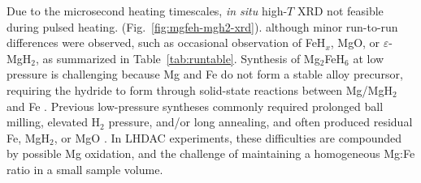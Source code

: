 \documentclass[draft,jgrga,12pt]{agujournal2019}
\begin{document}
Due to the microsecond heating timescales, \textit{in situ} high-$T$ XRD  not feasible during pulsed heating. 
 (Fig.~\ref{fig:mgfeh-mgh2-xrd}). 
 although minor run-to-run differences were observed, such as occasional observation of FeH$_x$, MgO, or $\varepsilon$-MgH$_2$, as summarized in Table~\ref{tab:runtable}.
Synthesis of Mg$_2$FeH$_6$ at low pressure is challenging because Mg and Fe do not form a stable alloy precursor, requiring the hydride to form through solid-state reactions between Mg/MgH$_2$ and Fe \cite{puszkiel_new_2018}. Previous low-pressure syntheses commonly required prolonged ball milling, elevated H$_2$ pressure, and/or long annealing, and often produced residual Fe, MgH$_2$, or MgO \cite{wang_preparation_2010}. 
In LHDAC experiments, these difficulties are compounded by possible Mg oxidation, and the challenge of maintaining a homogeneous Mg:Fe ratio in a small sample volume.


\end{document}
